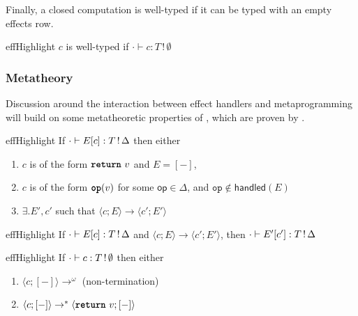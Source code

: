 Finally, a closed computation is well-typed if it can be typed with an empty effects row.  
\begin{definition}{effHighlight}
  $c$ is well-typed if $\cdot \vdash {c}: {T \, ! \, \emptyset}$
\end{definition}

\subsubsection{Metatheory}
Discussion around the interaction between effect handlers and metaprogramming will build on some metatheoretic properties of \efflang{}, which are proven by \citet{bauer-2014}.

\renewcommand{\effconfiguration}[2]{\langle {#1}; {#2} \rangle}
\renewcommand{\transition}[2]{#1 \rightarrow #2}

\begin{theorem}[Progress]{effHighlight}\label{thm:progress}
If $\cdot \vdash {E[c]}: {\effectType{T}}$ then either 
\begin{enumerate}
\item $c$ is of the form $\return{v}$ and $E = [-]$,
\item $c$ is of the form $\op{v}$ for some $\textsf{op} \in \Delta$, and $\texttt{op} \notin \textsf{handled}({E})$
\item $\exists. E', c'$ such that $\transition{\effconfiguration{c}{E}}{\effconfiguration{c'}{E'}}$
\end{enumerate}
\end{theorem}
\vspace{-\baselineskip}
\begin{theorem}[Preservation]{effHighlight}\label{thm:preservation}
If $\cdot \vdash {E[c]}: {\effectType{T}}$ and $\transition{\effconfiguration{c}{E}}{\effconfiguration{c'}{E'}}$, then $\cdot \vdash {E'[c']}: {\effectType{T}}$
\end{theorem}
\vspace{-\baselineskip}
\begin{corollary}{effHighlight}\label{thm:type-safety}
  If $\cdot \vdash {c}: {\effectType[\emptyset]{T}}$ then either 
\begin{enumerate}
\item $\langle c; [-] \rangle \to^{\omega}$ (non-termination)
\item $\langle c; [-] \rangle \to^{*} \langle \return{v}; [-] \rangle$
\end{enumerate}
\end{corollary}

